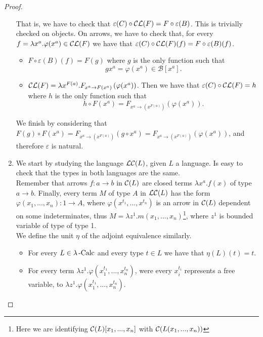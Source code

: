 \begin{proof}
\begin{enumerate}
    That is, we have to check that $\varepsilon(C)\circ \mathcal{C}\mathcal{L}(F) = F \circ \varepsilon(B)$. This is trivially checked on objects. On arrows, we have to check that, for every $f = \lambda x^a.\varphi(x^a) \in \mathcal{C}\mathcal{L}(F) $ we have that $\varepsilon(C)\circ \mathcal{C}\mathcal{L}(F) (f)= F \circ \varepsilon(B)(f)$.

    \begin{itemize}
    \item  $F \circ \varepsilon(B)(f) = F(g)$ where $g$ is the only function  such that$$gx^a = \varphi(x^a) \in \mathcal B[x^a].$$
    \item $\mathcal{C}\mathcal{L}(F) = \lambda x^{F(a)}.F_{x^a\to F(x^a)} \left ( \varphi(x^a)\right )$. Then we have that $\varepsilon(C)\circ \mathcal{C}\mathcal{L}(F) = h$ where $h$ is the only function such that $$h\circ F(x^a) = F_{x^a\to (x^{F(a)})}\left ( \varphi(x^a)\right ).$$
    \end{itemize}
    We finish by considering that $F(g)\circ F(x^a) = F_{x^a\to (x^{F(a)})}(g \circ x^a) = F_{x^a\to (x^{F(a)})}(\varphi(x^a)) $, and therefore $\varepsilon$ is natural.\\

  \item[\fbox{$ 1_{\mathcal A}\cong \LL \CC $}] We start by studying the language $\mathcal{L}\mathcal{C}(L)$, given $L$ a language. Is easy to check that the types in both languages are the same.\\

    Remember that arrows $f:a\to b$ in $\mathcal{C}(L)$ are closed terms $\lambda x^a.f(x)$ of type $a\to b$. Finally, every term $M$ of type $A$ in $\mathcal{L}\mathcal{C}(L)$ has the form $\varphi(x_1,...,x_n): 1 \to A$, where $\varphi(x^{t_1},...,x^{t_n})$ is an arrow in $\mathcal{C}(L)$ dependent on some indeterminates, thus $M =\lambda z^1.m(x_1,...,x_n)$\footnote{Here we are identifying $\mathcal{C}(L)[x_1,...,x_n]$ with $\mathcal{C}(L(x_1,...,x_n))$}, where $z^1$ is bounded variable of type of type 1.\\


    We define the unit $\eta$ of the adjoint equivalence similarly.
    \begin{itemize}
    \item For every $L\in \lambda\operatorname{-Calc}$ and every type $t\in L$ we have that $\eta(L)(t) = t$.
    \item For every term $\lambda z^1.\varphi (x_1^{t_1},...,x_n^{t_n})$, were every $x_i^{t_i}$ represents a free variable, to $\lambda z^1. \varphi (x_1^{t_1},...,x_n^{t_n}).$
    \end{itemize}



\end{enumerate}
\end{proof}
